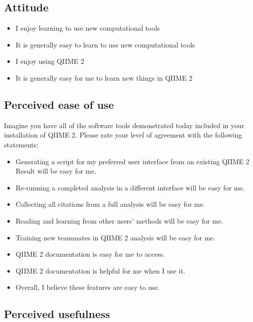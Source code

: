\subsection*{Attitude}

\begin{itemize}
    \item I enjoy learning to use new computational tools
    \item It is generally easy to learn to use new computational tools
    \item I enjoy using QIIME 2
    \item It is generally easy for me to learn new things in QIIME 2
\end{itemize}


\subsection*{Perceived ease of use}

\noindent Imagine you have all of the software tools demonstrated today included in your
installation of QIIME 2. Please rate your level of agreement with the following
statements:
\begin{itemize}
    \item Generating a script for my preferred user interface from an existing QIIME 2 Result will be easy for me.
    \item Re-running a completed analysis in a different interface will be easy for me.
    \item Collecting all citations from a full analysis will be easy for me.
    \item Reading and learning from other users’ methods will be easy for me.
    \item Training new teammates in QIIME 2 analysis will be easy for me.
    \item QIIME 2 documentation is easy for me to access.
    \item QIIME 2 documentation is helpful for me when I use it.
    \item Overall, I believe these features are easy to use.
\end{itemize}

\subsection*{Perceived usefulness}


